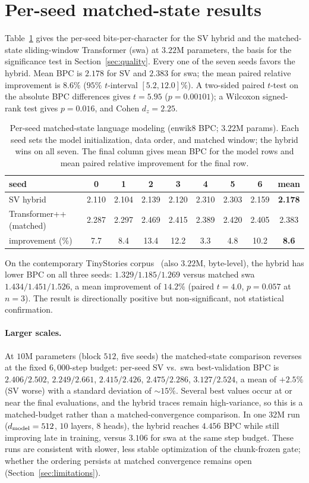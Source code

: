 \section{Per-seed matched-state results}\label{app:seeds}
Table~\ref{tab:seeds} gives the per-seed bits-per-character for the SV hybrid and the
matched-state sliding-window Transformer (swa) at $3.22$M parameters, the basis for the
significance test in Section~\ref{sec:quality}. Every one of the seven seeds favors the
hybrid. Mean BPC is $2.178$ for SV and $2.383$ for swa; the mean paired relative
improvement is $8.6\%$ ($95\%$ \(t\)-interval $[5.2, 12.0]\%$). A two-sided
paired \(t\)-test on the absolute BPC differences gives $t = 5.95$
($p = 0.00101$); a Wilcoxon signed-rank test gives $p = 0.016$,
and Cohen $d_z = 2.25$.

\begin{table}[h]
\centering
\caption{Per-seed matched-state language modeling (enwik8 BPC; $3.22$M params).
Each seed sets the model initialization, data order, and matched window; the hybrid
wins on all seven. The final column gives mean BPC for the model rows and mean paired
relative improvement for the final row.}
\label{tab:seeds}
\begin{tabular}{lcccccccc}
\toprule
seed & 0 & 1 & 2 & 3 & 4 & 5 & 6 & mean \\
\midrule
SV hybrid & 2.110 & 2.104 & 2.139 & 2.120 & 2.310 & 2.303 & 2.159 & \textbf{2.178} \\
Transformer++ (matched) & 2.287 & 2.297 & 2.469 & 2.415 & 2.389 & 2.420 & 2.405 & 2.383 \\
improvement (\%) & 7.7 & 8.4 & 13.4 & 12.2 & 3.3 & 4.8 & 10.2 & \textbf{8.6} \\
\bottomrule
\end{tabular}
\end{table}

On the contemporary TinyStories corpus~\citep{tinystories} (also $3.22$M,
byte-level), the hybrid has lower BPC on all three seeds:
$1.329/1.185/1.269$ versus matched swa $1.434/1.451/1.526$, a mean improvement
of $14.2\%$ (paired $t=4.0$, $p=0.057$ at $n=3$). The result is directionally
positive but non-significant, not statistical confirmation.

\paragraph{Larger scales.} At $10$M parameters (block $512$, five seeds) the
matched-state comparison reverses at the fixed \(6{,}000\)-step budget:
per-seed SV vs.\ swa best-validation BPC is $2.406/2.502$, $2.249/2.661$,
$2.415/2.426$, $2.475/2.286$, $3.127/2.524$, a mean of $+2.5\%$ (SV worse)
with a standard deviation of ${\sim}15\%$. Several best values occur at or near
the final evaluations, and the hybrid traces remain high-variance, so this is a
matched-budget rather than a matched-convergence comparison. In one \(32\)M run
(\(d_{\rm model}=512\), \(10\) layers, \(8\) heads), the hybrid reaches
\(4.456\) BPC while still improving late in training, versus \(3.106\) for swa
at the same step budget. These runs are consistent with slower, less stable
optimization of the chunk-frozen gate; whether the ordering persists at
matched convergence remains open
(Section~\ref{sec:limitations}).
